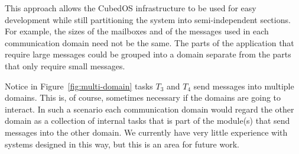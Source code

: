 This approach allows the CubedOS infrastructure to be used for easy development while still
partitioning the system into semi-independent sections. For example, the sizes of the mailboxes
and of the messages used in each communication domain need not be the same. The parts of the
application that require large messages could be grouped into a domain separate from the parts
that only require small messages.

Notice in Figure~\ref{fig:multi-domain} tasks $T_3$ and $T_4$ send messages into multiple
domains. This is, of course, sometimes necessary if the domains are going to interact. In such a
scenario each communication domain would regard the other domain as a collection of internal
tasks that is part of the module(s) that send messages into the other domain. We currently have
very little experience with systems designed in this way, but this is an area for future work.
